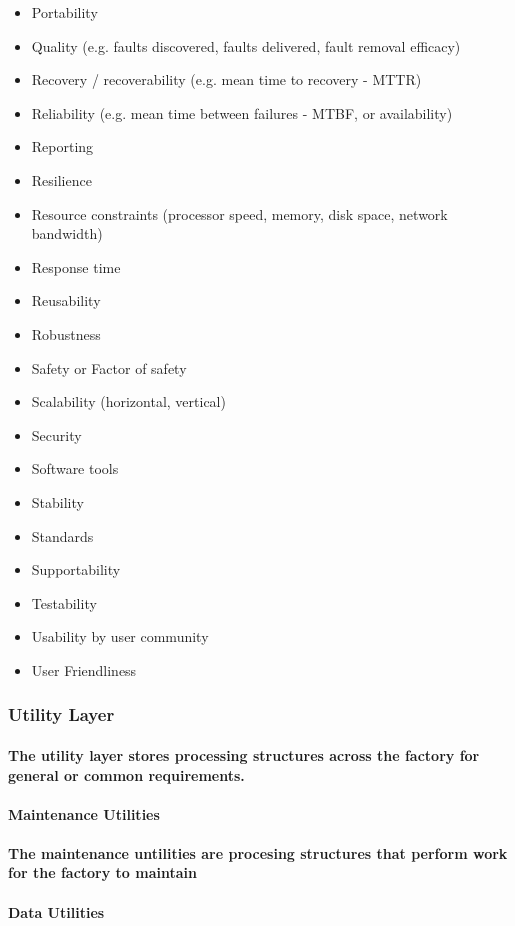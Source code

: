 \documentclass{acm_proc_article-sp}
\begin{document}
\begin{itemize}
\item Portability
\item Quality (e.g. faults discovered, faults delivered, fault removal efficacy)
\item Recovery / recoverability (e.g. mean time to recovery - MTTR)
\item Reliability (e.g. mean time between failures - MTBF, or availability)
\item Reporting
\item Resilience
\item Resource constraints (processor speed, memory, disk space, network bandwidth)
\item Response time
\item Reusability
\item Robustness
\item Safety or Factor of safety
\item Scalability (horizontal, vertical)
\item Security
\item Software tools
\item Stability
\item Standards
\item Supportability
\item Testability
\item Usability by user community
\item User Friendliness
\end{itemize}
\subsubsection{Utility Layer}
\paragraph{The utility layer stores processing structures across the factory for general or common requirements.}
\paragraph{Maintenance Utilities}
\paragraph{The maintenance untilities are procesing structures that perform work for the factory to maintain}
\paragraph{Data Utilities}
\end{document}
